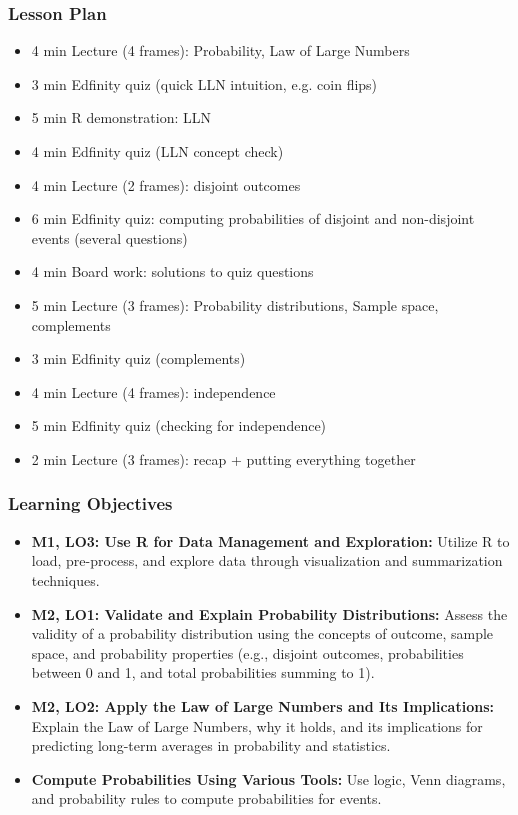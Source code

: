 \begin{frame}
    \frametitle{Lesson Plan}
    \begin{itemize}
        \item 4 min Lecture (4 frames): Probability, Law of Large Numbers
        \item 3 min Edfinity quiz (quick LLN intuition, e.g. coin flips)
        \item 5 min R demonstration: LLN
        \item 4 min Edfinity quiz (LLN concept check)
        \item 4 min Lecture (2 frames): disjoint outcomes
        \item 6 min Edfinity quiz: computing probabilities of disjoint and non-disjoint events (several questions)
        \item 4 min Board work: solutions to quiz questions
        \item 5 min Lecture (3 frames): Probability distributions, Sample space, complements
        \item 3 min Edfinity quiz (complements)
        \item 4 min Lecture (4 frames): independence
        \item 5 min Edfinity quiz (checking for independence)
        \item 2 min Lecture (3 frames): recap + putting everything together
    \end{itemize}
\end{frame}

\begin{frame}
    \frametitle{Learning Objectives}
    \begin{itemize}
        \item \textbf{M1, LO3: Use R for Data Management and Exploration:} Utilize R to load, pre-process, and explore data through visualization and summarization techniques.
        \item \textbf{M2, LO1: Validate and Explain Probability Distributions:} Assess the validity of a probability distribution using the concepts of outcome, sample space, and probability properties (e.g., disjoint outcomes, probabilities between 0 and 1, and total probabilities summing to 1).
        \item \textbf{M2, LO2: Apply the Law of Large Numbers and Its Implications:} Explain the Law of Large Numbers, why it holds, and its implications for predicting long-term averages in probability and statistics.
        \item \textbf{Compute Probabilities Using Various Tools:} Use logic, Venn diagrams, and probability rules to compute probabilities for events.
    \end{itemize}
\end{frame}

